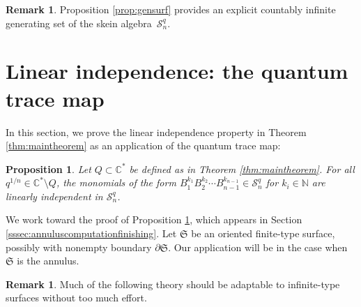 \documentclass[12pt,
	]{amsart}
\newtheorem{proposition}[theorem]{Proposition}
\theoremstyle{definition}
\newtheorem{remark}[theorem]{Remark}
\newcommand{\mbb}[1]{\mathbb{#1}}
\newcommand{\mcal}[1]{\mathcal{#1}}
\newcommand{\mfrak}[1]{\mathfrak{#1}}
\newcommand{\nnegZ}{\mbb{N}}
\newcommand{\C}{\mbb{C}}
\newcommand{\sC}{\C^\ast}
\newcommand{\sk}{\mcal{S}_n^q}
\newcommand{\surf}{\mfrak{S}}
\newcommand{\badset}{Q}
\newcommand{\qroot}{q^{1/n}}
\begin{document}
\begin{remark}
 Proposition \ref{prop:gensurf} provides an explicit countably infinite generating set of the skein algebra~$\sk$.  
\end{remark}

\section{Linear independence: the quantum trace map}\label{sec:linear-independence}

In this section, we prove the linear independence property in Theorem \ref{thm:maintheorem} as an application of the quantum trace map:

\begin{proposition}\label{prop:second-main-result-independence}
Let $\badset\subset\sC$ be defined as in Theorem {\upshape\ref{thm:maintheorem}}.  For all $\qroot\in\sC\setminus\badset$, the monomials of the form $B_{1}^{k_1}B_{2}^{k_2}\cdots B_{n-1}^{k_{n-1}}\in\sk$ for $k_i\in\nnegZ$ are linearly independent in $\sk$.
\end{proposition}

We work toward the proof of Proposition \ref{prop:second-main-result-independence}, which appears in Section \ref{sssec:annuluscomputationfinishing}. Let $\surf$ be an oriented finite-type surface, possibly with nonempty boundary $\partial\surf$.  Our application will be in the case when $\surf$ is the annulus.  

\begin{remark}
Much of the following theory should be adaptable to infinite-type surfaces  without too much effort.
\end{remark}
\end{document}
